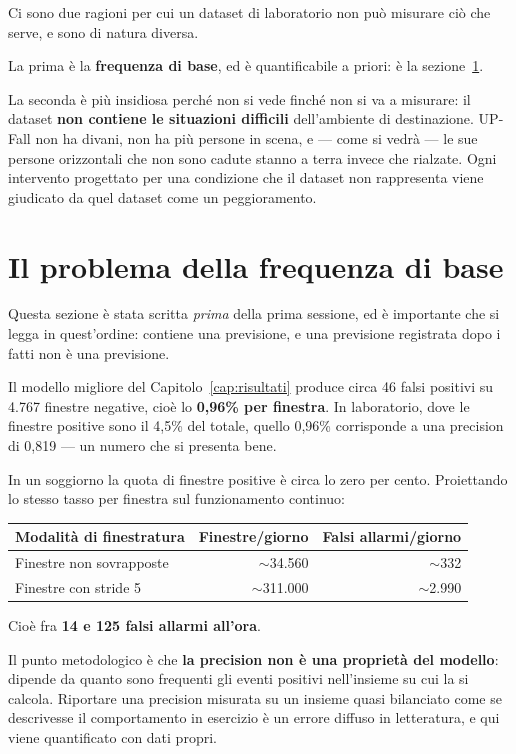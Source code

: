 Ci sono due ragioni per cui un dataset di laboratorio non può misurare ciò che serve, e sono di natura diversa.

La prima è la \textbf{frequenza di base}, ed è quantificabile a priori: è la sezione~\ref{sec:frequenza-base}.

La seconda è più insidiosa perché non si vede finché non si va a misurare: il dataset \textbf{non contiene le situazioni difficili} dell'ambiente di destinazione. UP-Fall non ha divani, non ha più persone in scena, e --- come si vedrà --- le sue persone orizzontali che non sono cadute stanno a terra invece che rialzate. Ogni intervento progettato per una condizione che il dataset non rappresenta viene giudicato da quel dataset come un peggioramento.

\section{Il problema della frequenza di base}
\label{sec:frequenza-base}

Questa sezione è stata scritta \emph{prima} della prima sessione, ed è importante che si legga in quest'ordine: contiene una previsione, e una previsione registrata dopo i fatti non è una previsione.

Il modello migliore del Capitolo~\ref{cap:risultati} produce circa 46 falsi positivi su 4.767 finestre negative, cioè lo \textbf{0,96\% per finestra}. In laboratorio, dove le finestre positive sono il 4,5\% del totale, quello 0,96\% corrisponde a una precision di 0,819 --- un numero che si presenta bene.

In un soggiorno la quota di finestre positive è circa lo zero per cento. Proiettando lo stesso tasso per finestra sul funzionamento continuo:

\begin{center}
\begin{tabular}{lrr}
\toprule
Modalità di finestratura & Finestre/giorno & Falsi allarmi/giorno \\
\midrule
Finestre non sovrapposte & $\sim$34.560 & $\sim$332 \\
Finestre con stride 5 & $\sim$311.000 & $\sim$2.990 \\
\bottomrule
\end{tabular}
\end{center}

Cioè fra \textbf{14 e 125 falsi allarmi all'ora}.

Il punto metodologico è che \textbf{la precision non è una proprietà del modello}: dipende da quanto sono frequenti gli eventi positivi nell'insieme su cui la si calcola. Riportare una precision misurata su un insieme quasi bilanciato come se descrivesse il comportamento in esercizio è un errore diffuso in letteratura, e qui viene quantificato con dati propri.

